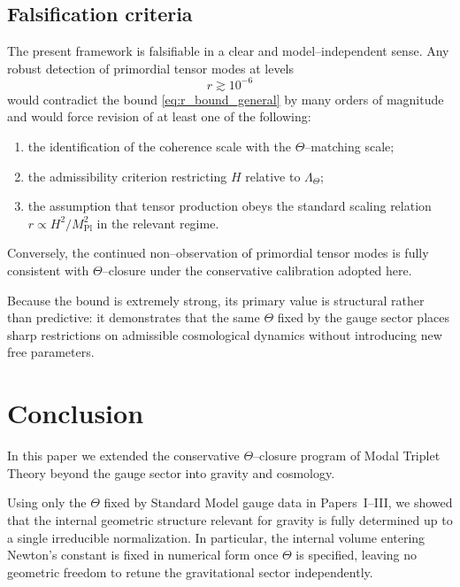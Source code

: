\documentclass[11pt]{article}
\begin{document}
\subsection{Falsification criteria}

The present framework is falsifiable in a clear and model--independent sense.
Any robust detection of primordial tensor modes at levels
\[
r \gtrsim 10^{-6}
\]
would contradict the bound \eqref{eq:r_bound_general} by many orders of magnitude
and would force revision of at least one of the following:
\begin{enumerate}
\item the identification of the coherence scale with the $\Theta$--matching scale;
\item the admissibility criterion restricting $H$ relative to $\Lambda_\Theta$;
\item the assumption that tensor production obeys the standard scaling relation
$r\propto H^2/M_{\mathrm{Pl}}^2$ in the relevant regime.
\end{enumerate}

Conversely, the continued non--observation of primordial tensor modes is fully
consistent with $\Theta$--closure under the conservative calibration adopted
here.

\begin{remark}
Because the bound is extremely strong, its primary value is structural rather
than predictive: it demonstrates that the same $\Theta$ fixed by the gauge
sector places sharp restrictions on admissible cosmological dynamics without
introducing new free parameters.
\end{remark}


\section{Conclusion}

In this paper we extended the conservative $\Theta$--closure program of Modal
Triplet Theory beyond the gauge sector into gravity and cosmology.

Using only the $\Theta$ fixed by Standard Model gauge data in Papers~I--III, we
showed that the internal geometric structure relevant for gravity is fully
determined up to a single irreducible normalization.
In particular, the internal volume entering Newton's constant is fixed in
numerical form once $\Theta$ is specified, leaving no geometric freedom to
retune the gravitational sector independently.
\end{document}

